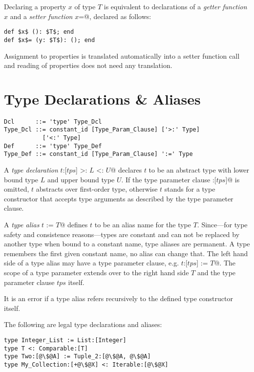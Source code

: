 Declaring a property $x$ of type $T$ is equivalent to declarations of a {\em getter function} $x$ and a {\em setter function} \lstinline@$x$=@, declared as follows:

\begin{lstlisting}
def $x$ (): $T$; end
def $x$= (y: $T$): (); end
\end{lstlisting}

Assignment to properties is translated automatically into a setter function call and reading of properties does not need any translation. 

\section{Type Declarations \& Aliases}

\syntax\begin{lstlisting}
Dcl      ::= 'type' Type_Dcl
Type_Dcl ::= constant_id [Type_Param_Clause] ['>:' Type] 
           ['<:' Type]
Def      ::= 'type' Type_Def
Type_Def ::= constant_id [Type_Param_Clause] ':=' Type
\end{lstlisting}

A {\em type declaration} \lstinline@type $t$:[$tps$] >: $L$ <: $U$@ declares $t$ to be an abstract type with lower bound type $L$ and upper bound type $U$. If the type parameter clause \lstinline@:[$tps$]@ is omitted, $t$ abstracts over first-order type, otherwise $t$ stands for a type constructor that accepts type arguments as described by the type parameter clause. 

A {\em type alias} \lstinline@type $t$ := $T$@ defines $t$ to be an alias name for the type $T$. Since---for type safety and consistence reasons---types are constant and can not be replaced by another type when bound to a constant name, type aliases are permanent. A type remembers the first given constant name, no alias can change that. The left hand side of a type alias may have a type parameter clause, e.g. \lstinline@type $t$:[$tps$] := $T$@. The scope of a type parameter extends over to the right hand side $T$ and the type parameter clause $tps$ itself. 

It is an error if a type alias refers recursively to the defined type constructor itself. 

\example The following are legal type declarations and aliases:
\begin{lstlisting}[escapechar=@]
type Integer_List := List:[Integer]
type T <: Comparable:[T]
type Two:[@\$@A] := Tuple_2:[@\$@A, @\$@A]
type My_Collection:[+@\$@X] <: Iterable:[@\$@X]
\end{lstlisting}

